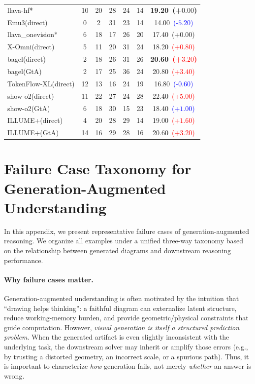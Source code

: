 \documentclass{article}
\theoremstyle{plain}
\theoremstyle{definition}
\theoremstyle{remark}
\begin{document}
\begin{table}[!htbp]
{\begin{tabular}{@{}lcccccc@{}}
\midrule

\rowcolor{gray!12}
llava-hf* & 10 & 20 & 28 & 24 & 14 & \textbf{19.20~(+$0.00$)} \\
Emu3(direct) & 0 & 2 & 31 & 23 & 14 & 14.00~\textcolor{blue}{(-$5.20$)} \\

\midrule

\rowcolor{gray!12}
llava\_onevision* & 6 & 18 & 17 & 26 & 20 & 17.40~(+$0.00$) \\
X-Omni(direct) & 5 & 11 & 20 & 31 & 24 & 18.20~\textcolor{red}{(+$0.80$)} \\
bagel(direct) & 2 & 18 & 26 & 31 & 26 & \textbf{20.60~\textcolor{red}{(+$3.20$)}} \\
bagel(GtA) & 2 & 17 & 25 & 36 & 24 & 20.80~\textcolor{red}{(+$3.40$)} \\
TokenFlow-XL(direct) & 12 & 13 & 16 & 24 & 19 & 16.80~\textcolor{blue}{(-$0.60$)} \\
show-o2(direct) & 11 & 22 & 27 & 24 & 28 & 22.40~\textcolor{red}{(+$5.00$)} \\
show-o2(GtA) & 6 & 18 & 30 & 15 & 23 & 18.40~\textcolor{blue}{(+$1.00$)} \\
ILLUME+(direct) & 4 & 20 & 28 & 29 & 14 & 19.00~\textcolor{red}{(+$1.60$)} \\
ILLUME+(GtA) & 14 & 16 & 29 & 28 & 16 & 20.60~\textcolor{red}{(+$3.20$)} \\

\bottomrule
\end{tabular}%
}
\end{table}

\section{Failure Case Taxonomy for Generation-Augmented Understanding}
\label{sec:appendix_failure_cases}

In this appendix, we present representative failure cases of generation-augmented reasoning.
We organize all examples under a unified three-way taxonomy based on the relationship
between generated diagrams and downstream reasoning performance.

\paragraph{Why failure cases matter.}
Generation-augmented understanding is often motivated by the intuition that ``drawing helps thinking'':
a faithful diagram can externalize latent structure, reduce working-memory burden, and provide
geometric/physical constraints that guide computation.
However, \emph{visual generation is itself a structured prediction problem}.
When the generated artifact is even slightly inconsistent with the underlying task, the downstream solver
may inherit or amplify those errors (e.g., by trusting a distorted geometry, an incorrect scale, or a spurious path).
Thus, it is important to characterize \emph{how} generation fails, not merely \emph{whether} an answer is wrong.
\end{document}
